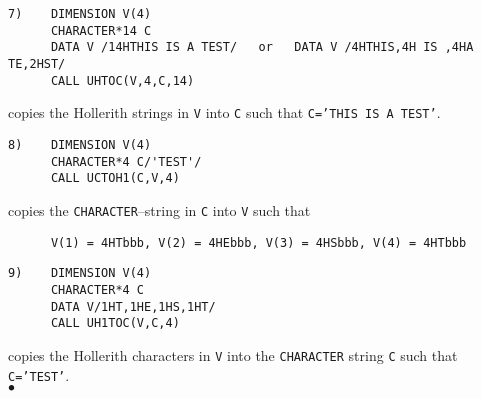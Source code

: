 \begin{verbatim}
7)    DIMENSION V(4)
      CHARACTER*14 C
      DATA V /14HTHIS IS A TEST/   or   DATA V /4HTHIS,4H IS ,4HA TE,2HST/
      CALL UHTOC(V,4,C,14)
\end{verbatim}
copies the Hollerith strings in {\tt V} into {\tt C} such that
{\tt C='THIS IS A TEST'}.
\begin{verbatim}
8)    DIMENSION V(4)
      CHARACTER*4 C/'TEST'/
      CALL UCTOH1(C,V,4)
\end{verbatim}
copies the {\tt CHARACTER}--string in {\tt C} into {\tt V} such that
\begin{verbatim}
      V(1) = 4HTbbb, V(2) = 4HEbbb, V(3) = 4HSbbb, V(4) = 4HTbbb
\end{verbatim}
\begin{verbatim}
9)    DIMENSION V(4)
      CHARACTER*4 C
      DATA V/1HT,1HE,1HS,1HT/
      CALL UH1TOC(V,C,4)
\end{verbatim}
copies the Hollerith characters in {\tt V} into the {\tt CHARACTER}
string {\tt C} such that {\tt C='TEST'}.
\\ $\bullet$
